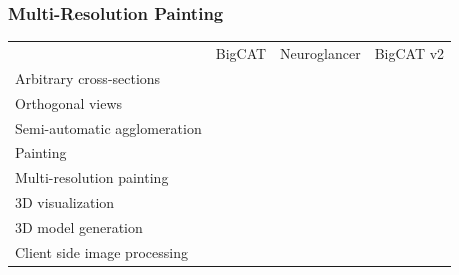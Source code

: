 \documentclass[aspectratio=169,table]{beamer}
\newcommand{\cmark}{\ding{51}}%
\newcommand{\xmark}{\ding{55}}%
\newcommand{\gcmark}{{\color{green}\cmark}}%
\newcommand{\ycmark}{{\color{yellow}\cmark}}%
\newcommand{\rxmark}{{\color{red}\xmark}}%
\begin{document}
\begin{frame}
    \frametitle{Multi-Resolution Painting}
    \small
    \vspace{1cm}
    \begin{table}
        \centering
        \begin{tabular}{lccc}
                                                           & BigCAT & Neuroglancer & BigCAT v2 \\
          Arbitrary cross-sections                         & \gcmark & \gcmark & \gcmark \\
          Orthogonal views                                 & \rxmark & \gcmark & \gcmark \\
          Semi-automatic agglomeration & \rxmark & \rxmark & \gcmark \\
          \rowcolor{black!20} Painting                     & \gcmark & \rxmark & \gcmark \\
          \rowcolor{black!20} Multi-resolution painting    & \rxmark & \rxmark & \gcmark \\
          3D visualization                                 & \rxmark & \gcmark & \gcmark \\
          3D model generation                              & \rxmark & \rxmark & \gcmark \\
          Client side image processing                     & \gcmark & \ycmark & \gcmark \\
        \end{tabular}
    \end{table}
\end{frame}
\end{document}
